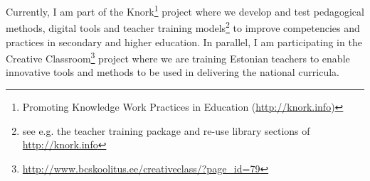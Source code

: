 Currently, I am part of the Knork\footnote{Promoting Knowledge Work Practices in Education (\url{http://knork.info})} project where we develop and test pedagogical methods, digital tools and teacher training models\footnote{see e.g. the teacher training package and re-use library sections of \url{http://knork.info}} to improve competencies and practices in secondary and higher education. 
In parallel, I am participating in the Creative Classroom\footnote{\url{http://www.bcskoolitus.ee/creativeclass/?page_id=79}} project where we are training Estonian teachers  to enable innovative tools and methods to be used in delivering the national curricula.

  